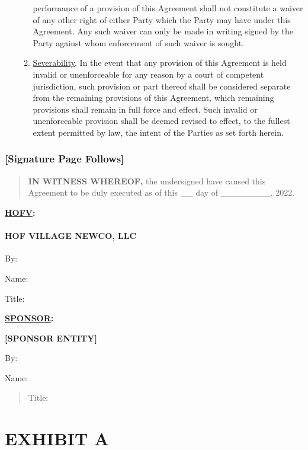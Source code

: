 \documentclass{article}
\begin{document}
\begin{enumerate}
\begin{enumerate}
    performance of a provision of this Agreement shall not constitute a
    waiver of any other right of either Party which the Party may have
    under this Agreement. Any such waiver can only be made in writing
    signed by the Party against whom enforcement of such waiver is
    sought.
  \item
    \uline{Severability}. In the event that any provision of this
    Agreement is held invalid or unenforceable for any reason by a court
    of competent jurisdiction, such provision or part thereof shall be
    considered separate from the remaining provisions of this Agreement,
    which remaining provisions shall remain in full force and effect.
    Such invalid or unenforceable provision shall be deemed revised to
    effect, to the fullest extent permitted by law, the intent of the
    Parties as set forth herein.
  \end{enumerate}
\end{enumerate}

\hypertarget{signature-page-follows}{%
\subsubsection{{[}Signature Page
Follows{]}}\label{signature-page-follows}}

\begin{quote}
\textbf{IN WITNESS WHEREOF,} the undersigned have caused this Agreement
to be duly executed as of this \_\_ day of \_\_\_\_\_\_\_\_, 2022.
\end{quote}

\textbf{\uline{HOFV}:}

\hypertarget{hof-village-newco-llc}{%
\paragraph{\texorpdfstring{\textbf{HOF VILLAGE NEWCO, LLC}
}{HOF VILLAGE NEWCO, LLC }}\label{hof-village-newco-llc}}

By:

Name:

Title:

\textbf{\uline{SPONSOR}:}

\textbf{{[}SPONSOR ENTITY{]}}

By:

Name:

\begin{quote}
Title:
\end{quote}

\hypertarget{exhibit-a}{%
\section{EXHIBIT A}\label{exhibit-a}}
\end{document}
